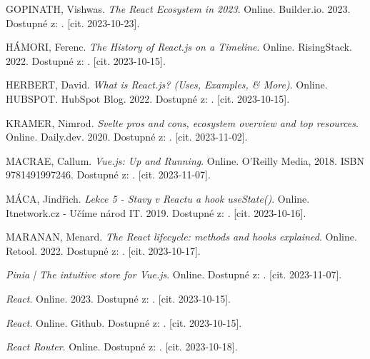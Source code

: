 \begin{thebibliography}{99}
\textsc{GOPINATH}, Vishwas. \emph{The React Ecosystem in 2023}. Online. Builder.io. 2023. Dostupné z: . [cit. 2023-10-23].

\textsc{HÁMORI}, Ferenc. \emph{The History of React.js on a Timeline}. Online. RisingStack. 2022. Dostupné z: . [cit. 2023-10-15].

\textsc{HERBERT}, David. \emph{What is React.js? (Uses, Examples, \& More)}. Online. HUBSPOT. HubSpot Blog. 2022. Dostupné z: . [cit. 2023-10-15].

\textsc{KRAMER}, Nimrod. \emph{Svelte pros and cons, ecosystem overview and top resources}. Online. Daily.dev. 2020. Dostupné z: . [cit. 2023-11-02].

\textsc{MACRAE}, Callum. \emph{Vue.js: Up and Running}. Online. O'Reilly Media, 2018. ISBN 9781491997246. Dostupné z: . [cit. 2023-11-07].

\textsc{MÁCA}, Jindřich. \emph{Lekce 5 - Stavy v Reactu a hook useState()}. Online. Itnetwork.cz - Učíme národ IT. 2019. Dostupné z: . [cit. 2023-10-16].

\textsc{MARANAN}, Menard. \emph{The React lifecycle: methods and hooks explained}. Online. Retool. 2022. Dostupné z: . [cit. 2023-10-17].

\emph{Pinia | The intuitive store for Vue.js}. Online. Dostupné z: . [cit. 2023-11-07].

\emph{React}. Online. 2023. Dostupné z: . [cit. 2023-10-15].

\emph{React}. Online. Github. Dostupné z: . [cit. 2023-10-15].

\emph{React Router}. Online. Dostupné z: . [cit. 2023-10-18].


\end{thebibliography}
